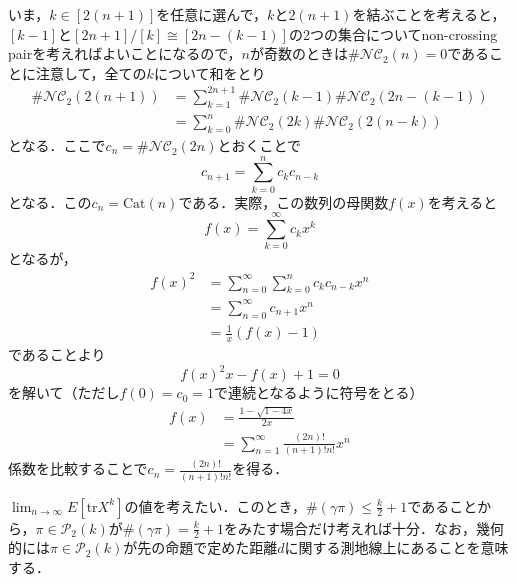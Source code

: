 \documentclass{ltjsarticle}
\makeatletter
\theoremstyle{mystyle1}
\theoremstyle{mystyle2}
\theoremstyle{mystyle3}
\renewenvironment{proof}[1][\proofname]{\par
  \pushQED{\qed}%
  \normalfont
  \topsep6\p@\@plus6\p@ \trivlist
  \item[\hskip\labelsep{\bfseries\sffamily #1}]\ignorespaces
}{%
  \popQED\endtrivlist\@endpefalse
}
\renewcommand\proofname{証明}
\makeatother
\begin{document}
\begin{proof}
    いま，$k\in[2(n+1)]$を任意に選んで，$k$と$2(n+1)$を結ぶことを考えると，$[k-1]$と$[2n+1]/[k]\cong [2n-(k-1)]$の2つの集合についてnon-crossing pairを考えればよいことになるので，$n$が奇数のときは$\#\mathcal{NC}_2(n)=0$であることに注意して，全ての$k$について和をとり
    \begin{equation}
        \begin{split}
            \#\mathcal{NC}_2(2(n+1))&=\sum_{k=1}^{2n+1}\#\mathcal{NC}_2(k-1)\#\mathcal{NC}_2(2n-(k-1)) \\
            &=\sum_{k=0}^{n}\#\mathcal{NC}_2(2k)\#\mathcal{NC}_2(2(n-k))
        \end{split}
    \end{equation}
    となる．ここで$c_{n}=\#\mathcal{NC}_2(2n)$とおくことで
    \begin{equation}
        c_{n+1}=\sum_{k=0}^n c_kc_{n-k}
    \end{equation}
    となる．この$c_n=\mathrm{Cat}(n)$である．実際，この数列の母関数$f(x)$を考えると
    \begin{equation}
        f(x)=\sum_{k=0}^\infty c_kx^k
    \end{equation}
    となるが，
    \begin{equation}
        \begin{split}
            f(x)^2&=\sum_{n=0}^\infty\sum_{k=0}^n c_kc_{n-k} x^n \\
            &=\sum_{n=0}^\infty c_{n+1}x^n \\
            &=\frac{1}{x}(f(x)-1)
        \end{split}
    \end{equation}
    であることより
    \begin{equation}
        f(x)^2x-f(x)+1=0
    \end{equation}
    を解いて（ただし$f(0)=c_0=1$で連続となるように符号をとる）
    \begin{equation}
        \begin{split}
            f(x)&=\frac{1-\sqrt{1-4x}}{2x} \\
            &=\sum_{n=1}^\infty \frac{(2n)!}{(n+1)!n!}x^n
        \end{split}
    \end{equation}
    係数を比較することで$c_n=\frac{(2n)!}{(n+1)!n!}$を得る．

\end{proof}

$\lim_{n\to\infty}E[\mathrm{tr} X^k]$の値を考えたい．このとき，$\#(\gamma\pi)\leq \frac{k}{2}+1$であることから，$\pi\in\mathcal{P}_2(k)$が$\#(\gamma\pi)= \frac{k}{2}+1$をみたす場合だけ考えれば十分．なお，幾何的には$\pi\in\mathcal{P}_2(k)$が先の命題で定めた距離$d$に関する測地線上にあることを意味する．
\end{document}
